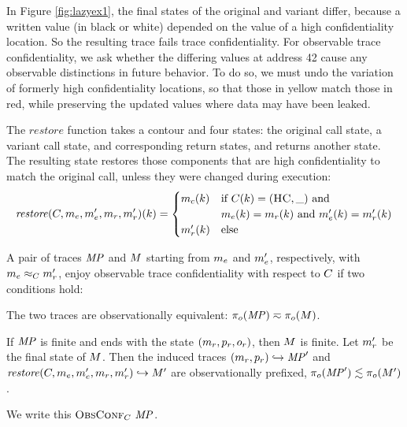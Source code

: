 \documentclass[acmsmall,review,anonymous]{acmart}\settopmatter{printfolios=true,printccs=false,printacmref=false}
\begin{document}
      In Figure \ref{fig:lazyex1}, the final states of the original and variant
      differ, because a written value (in black or white) depended on the value
      of a high confidentiality location. So the resulting trace fails trace
      confidentiality. For observable trace confidentiality, we ask whether the
      differing values at address 42 cause any observable distinctions in
      future behavior. To do so, we must undo the variation of formerly high
      confidentiality locations, so that those in yellow match those in red,
      while preserving the updated values where data may have been leaked.

      The \(\mathit{restore}\) function takes a contour and four states: the
      original call state, a variant call state, and corresponding return
      states, and returns another state. The resulting state restores those
      components that are high confidentiality to match the original call,
      unless they were changed during execution:
      \[\mathit{restore}(C,m_e,m_e',m_r,m_r')(k) =
        \begin{cases}
          m_c(k) & \text{if } C(k) = (\textsc{HC},\_) \text{ and } \\
                  & m_e(k) = m_r(k) \text{ and }
                    m_e'(k) = m_r'(k) \\
          m_r'(k) & \text{else} \\
        \end{cases}\]

      A pair of traces \(\mathit{MP}\) and \(M\) starting from \(m_e\) and
      \(m_e'\), respectively, with \(m_e \approx_C m_r'\),
      enjoy observable trace confidentiality with respect to \(C\) if
      two conditions hold:

      The two traces are observationally equivalent: \(\pi_o(\mathit{MP}) \eqsim
      \pi_o(M)\).

      If \(\mathit{MP}\) is finite and ends with the state
      \((m_r,p_r,o_r)\), then \(M\) is finite. Let
      \(m_r'\) be the final state of \(M\). Then the induced traces
      \((m_r,p_r) \hookrightarrow \mathit{MP}'\) and
      \(\mathit{restore}(C,m_e,m_e',m_r,m_r')
      \hookrightarrow M'\) are observationally prefixed,
      \(\pi_o(\mathit{MP}') \lesssim \pi_o(M')\).

      We write this \(\text{\sc ObsConf}_C ~ \mathit{MP}\).
\end{document}
